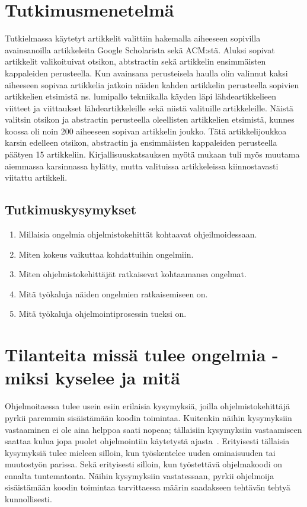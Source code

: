 \documentclass[finnish]{../tktltiki2}
\theoremstyle{definition}
\theoremstyle{remark}
\begin{document}
\section{Tutkimusmenetelmä}
Tutkielmassa käytetyt artikkelit valittiin hakemalla aiheeseen sopivilla avainsanoilla artikkeleita Google Scholarista sekä ACM:stä. Aluksi sopivat artikkelit valikoituivat otsikon, abtstractin sekä artikkelin ensimmäisten kappaleiden perusteella. Kun avainsana perusteisela haulla olin valinnut kaksi aiheeseen sopivaa artikkelia jatkoin näiden kahden artikkelin perusteella sopivien artikkelien etsimistä ns. lumipallo tekniikalla käyden läpi lähdeartikkelieen viitteet ja viittaukset lähdeartikkeleille sekä niistä valituille artikkeleille. Näistä valitsin otsikon ja abstractin perusteella oleellisten artikkelien etsimistä, kunnes koossa oli noin 200 aiheeseen sopivan artikkelin joukko. Tätä artikkelijoukkoa karsin edelleen otsikon, abstractin ja ensimmäisten kappaleiden perusteella päätyen 15 artikkeliin. Kirjallisuuskatsauksen myötä mukaan tuli myös muutama aiemmassa karsinnassa hylätty, mutta valituissa artikkeleissa kiinnostavasti viitattu artikkeli.

\subsection{Tutkimuskysymykset}
\begin{enumerate}
\item Millaisia ongelmia ohjelmistokehittät kohtaavat ohjeilmoidessaan.
\item Miten kokeus vaikuttaa kohdattuihin ongelmiin.
\item Miten ohjelmistokehittäjät ratkaisevat kohtaamansa ongelmat.
\item Mitä työkaluja näiden ongelmien ratkaisemiseen on.
\item Mitä työkaluja ohjelmointiprosessin tueksi on.
\end{enumerate}

\section{Tilanteita missä tulee ongelmia - miksi kyselee ja mitä}
Ohjelmoitaessa tulee usein esiin erilaisia kysymyksiä, joilla ohjelmistokehittäjä pyrkii paremmin sisäistämään koodin toimintaa. Kuitenkin näihin kysymyksiin vastaaminen ei ole aina helppoa saati nopeaa; tällaisiin kysymyksiin vastaamiseen saattaa kulua jopa puolet ohjelmointiin käytetystä ajasta~\cite{eliciting-design-requirements-for-maintenance-oriented-ides}. Erityisesti tällaisia kysymyksiä tulee mieleen silloin, kun työskentelee uuden ominaisuuden tai muutostyön parissa. Sekä erityisesti silloin, kun työstettävä ohjelmakoodi on ennalta tuntematonta.
Näihin kysymyksiin vastatessaan, pyrkii ohjelmoija sisäistämään koodin toimintaa tarvittaessa määrin saadakseen tehtävän tehtyä kunnollisesti.
\end{document}
